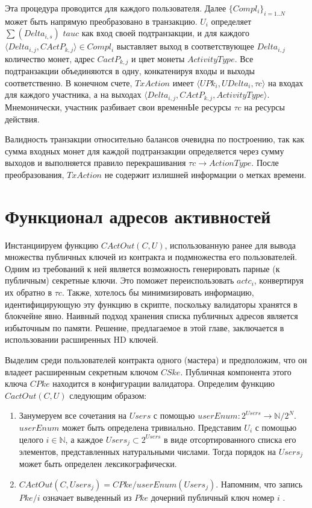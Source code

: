 \documentclass[specification,annotation]{itmo-student-thesis}
\begin{document}
Эта процедура проводится для каждого пользователя. Далее
$\{Compl_i\}_{i=1..N}$ может быть напрямую преобразовано в
транзакцию. $U_i$ определяет $\sum(Delta_{i,s})$ $tauc$ как вход своей
подтранзакции, и для каждого $\langle Delta_{i,j}, CActP_{k,j}\rangle
\in Compl_i$ выставляет выход в соответствующее $Delta_{i,j}$
количество монет, адрес $CactP_{k,j}$ и цвет монеты
$ActivityType$. Все подтранзакции объединяются в одну, конкатенируя
входы и выходы соответственно. В конечном счете, $TxAction$ имеет
$\langle UPk_i, UDelta_i, \tau c\rangle$ на входах для каждого
участника, а на выходах $\langle Delta_{i,j}, CActP_{k,j},
ActivityType\rangle$. Мнемонически, участник разбивает свои временнЫе
ресурсы $\tau c$ на ресурсы действия.

Валидность транзакции относительно балансов очевидна по построению,
так как сумма входных монет для каждой подтранзакции определяется
через сумму выходов и выполняется правило перекрашивания $\tau c
\rightarrow ActionType$. После преобразования, $TxAction$ не содержит
излишней информации о метках времени.

\section{Функционал адресов активностей}

Инстанциируем функцию $CActOut(C, U)$, использованную ранее для вывода
множества публичных ключей из контракта и подмножества его
пользователей. Одним из требований к ней является возможность
генерировать парные (к публичным) секретные ключи. Это поможет
переиспользовать $actc_i$, конвертируя их обратно в $\tau c$. Также,
хотелось бы минимизировать информацию, идентифицирующую эту функцию в
скрипте, поскольку валидаторы хранятся в блокчейне явно. Наивный
подход хранения списка публичных адресов является избыточным по
памяти. Решение, предлагаемое в этой главе, заключается в
использовании расширенных HD ключей.

Выделим среди пользователей контракта одного (мастера) и предположим,
что он владеет расширенным секретным ключом $CSke$. Публичная
компонента этого ключа $CPke$ находится в конфигурации
валидатора. Определим функцию $CactOut(C,U)$ следующим образом:

\begin{enumerate}
\item Занумеруем все сочетания на $Users$ с помощью $userEnum :
  2^{Users} \rightarrow \mathbb{N} / 2^N$. $userEnum$ может быть
  определена тривиально. Представим $U_i$ с помощью целого $i \in
  \mathbb{N}$, а каждое $Users_j \subset 2^{Users}$ в виде
  отсортированного списка его элементов, представленных натуральными
  числами. Тогда порядок на $Users_j$ может быть определен
  лексикографически.
\item $CActOut(C,Users_j) = CPke/userEnum(Users_j)$. Напомним, что
  запись $Pke/i$ означает выведенный из $Pke$ дочерний публичный ключ
  номер $i$ .
\end{enumerate}
\end{document}
